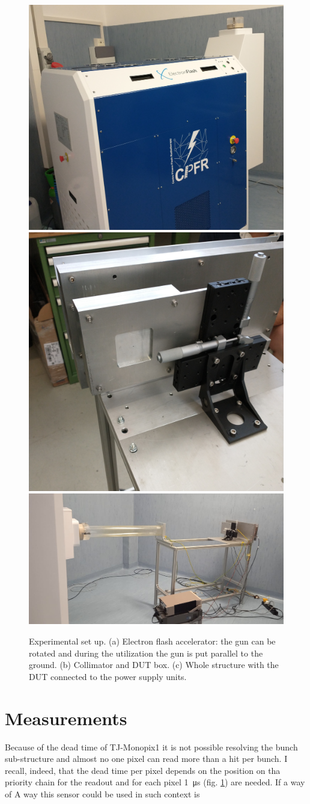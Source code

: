       \begin{figure}[h!]
         \centering
         \includegraphics[width=.40\linewidth]{figures/test_beam/electron_flash.jpg}
         \includegraphics[width=.35\linewidth]{figures/test_beam/collimator_box.jpg}\\     
         \includegraphics[width=.77\linewidth]{figures/test_beam/carrello.jpeg} 
         \label{fig:}
         \caption{Experimental set up. (a) Electron flash accelerator: the gun can be rotated and during the utilization the gun is put parallel to the ground. (b) Collimator and DUT box. (c) Whole structure with the DUT connected to the power supply units.}
      \end{figure}  

\section{Measurements}
   Because of the dead time of TJ-Monopix1 it is not possible resolving the bunch sub-structure and almost no one pixel can read more than a hit per bunch. I recall, indeed, that the dead time per pixel depends on the position on tha priority chain for the readout and for each pixel  \SI{1}{\us} (fig. \ref{fig:}) are needed. 
   If a way of 
   A way this sensor could be used in such context is  
   
